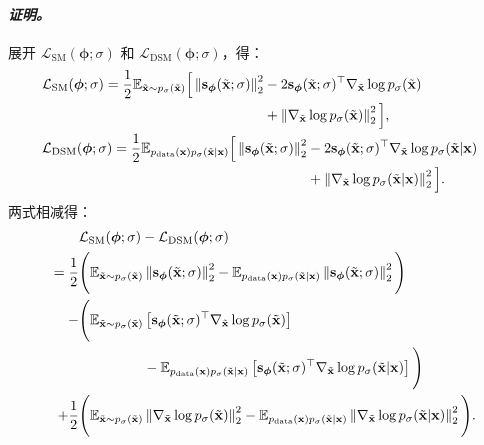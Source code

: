 \paragraph{\textit{证明。}} 展开 $\mathcal{L}_{\text{SM}}(\bm{\phi}; \sigma)$ 和 $\mathcal{L}_{\text{DSM}}(\bm{\phi}; \sigma)$，得：
\begin{align*}
 &\mathcal{L}_{\text{SM}}(\bm{\phi}; \sigma) = \frac{1}{2} \mathbb{E}_{\tilde{{\mathbf{x}}} \sim p_\sigma(\tilde{{\mathbf{x}}})} 
 \begin{aligned}[t]
         \Big[ 
    \left\lVert{\mathbf{s}}_{\bm{\phi}}(\tilde{{\mathbf{x}}}; \sigma)\right\rVert_2^2 
    &- 2 {\mathbf{s}}_{\bm{\phi}}(\tilde{{\mathbf{x}}}; \sigma)^\top  \nabla_{\tilde{{\mathbf{x}}}} \log p_\sigma(\tilde{{\mathbf{x}}}) \\
    &+ \left\lVert\nabla_{\tilde{{\mathbf{x}}}} \log p_\sigma(\tilde{{\mathbf{x}}})\right\rVert_2^2 
    \Big], 
 \end{aligned}
\\
&\mathcal{L}_{\text{DSM}}(\bm{\phi}; \sigma) = \frac{1}{2} \mathbb{E}_{ p_{\text{data}}({\mathbf{x}})p_{\sigma}(\tilde{{\mathbf{x}}} | {\mathbf{x}})}
 \begin{aligned}[t]
         \Big[
    \left\lVert{\mathbf{s}}_{\bm{\phi}}(\tilde{{\mathbf{x}}}; \sigma)\right\rVert_2^2 
    &- 2 {\mathbf{s}}_{\bm{\phi}}(\tilde{{\mathbf{x}}}; \sigma)^\top \nabla_{\tilde{{\mathbf{x}}}} \log p_{\sigma}(\tilde{{\mathbf{x}}} | {\mathbf{x}}) \\
    &+ \left\lVert\nabla_{\tilde{{\mathbf{x}}}} \log p_{\sigma}(\tilde{{\mathbf{x}}} | {\mathbf{x}})\right\rVert_2^2 
    \Big].
 \end{aligned}
\end{align*}
两式相减得：
\begin{align*}
 &\mathcal{L}_{\text{SM}}(\bm{\phi}; \sigma) -\mathcal{L}_{\text{DSM}}(\bm{\phi}; \sigma) 
 \\= \frac{1}{2} &\Bigg( \mathbb{E}_{\tilde{{\mathbf{x}}} \sim p_\sigma(\tilde{{\mathbf{x}}})} \left\lVert{\mathbf{s}}_{\bm{\phi}}(\tilde{{\mathbf{x}}}; \sigma)\right\rVert_2^2 - \mathbb{E}_{ p_{\text{data}}({\mathbf{x}})p_{\sigma}(\tilde{{\mathbf{x}}} | {\mathbf{x}})} \left\lVert{\mathbf{s}}_{\bm{\phi}}(\tilde{{\mathbf{x}}}; \sigma)\right\rVert_2^2\Bigg)
 \\ \quad - &  
 \begin{aligned}[t]
 \Bigg(
      \mathbb{E}_{\tilde{{\mathbf{x}}} \sim p_\sigma(\tilde{{\mathbf{x}}})}  &\left[ {\mathbf{s}}_{\bm{\phi}}(\tilde{{\mathbf{x}}}; \sigma)^\top  \nabla_{\tilde{{\mathbf{x}}}} \log p_\sigma(\tilde{{\mathbf{x}}}) \right] \\ 
      &- \mathbb{E}_{ p_{\text{data}}({\mathbf{x}})p_{\sigma}(\tilde{{\mathbf{x}}} | {\mathbf{x}})}\left[ {\mathbf{s}}_{\bm{\phi}}(\tilde{{\mathbf{x}}}; \sigma)^\top  \nabla_{\tilde{{\mathbf{x}}}} \log p_\sigma(\tilde{{\mathbf{x}}}| {\mathbf{x}})\right]
      \Bigg)
 \end{aligned}
 \\ \quad +  \frac{1}{2}&\Bigg(\mathbb{E}_{\tilde{{\mathbf{x}}} \sim p_\sigma(\tilde{{\mathbf{x}}})}  \left\lVert\nabla_{\tilde{{\mathbf{x}}}} \log p_\sigma(\tilde{{\mathbf{x}}})\right\rVert_2^2  -  \mathbb{E}_{ p_{\text{data}}({\mathbf{x}})p_{\sigma}(\tilde{{\mathbf{x}}} | {\mathbf{x}})} \left\lVert\nabla_{\tilde{{\mathbf{x}}}} \log p_{\sigma}(\tilde{{\mathbf{x}}} | {\mathbf{x}})\right\rVert_2^2   \Bigg).
\end{align*}
